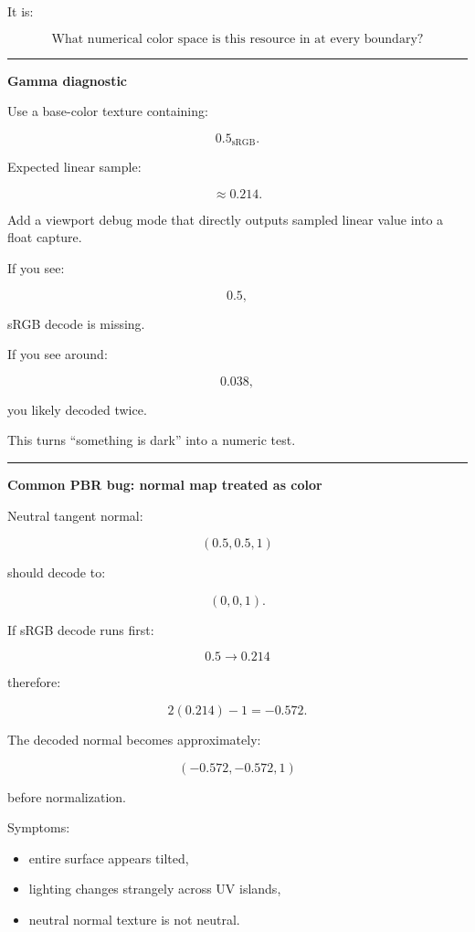 It is:

\[
\boxed{
\text{What numerical color space is this resource in at every boundary?}
}
\]

\begin{center}\rule{0.5\linewidth}{0.5pt}\end{center}

\textbf{Gamma diagnostic}

Use a base-color texture containing:

\[
0.5_{\text{sRGB}}.
\]

Expected linear sample:

\[
\approx0.214.
\]

Add a viewport debug mode that directly outputs sampled linear value into a float capture.

If you see:

\[
0.5,
\]

sRGB decode is missing.

If you see around:

\[
0.038,
\]

you likely decoded twice.

This turns ``something is dark'' into a numeric test.

\begin{center}\rule{0.5\linewidth}{0.5pt}\end{center}

\textbf{Common PBR bug: normal map treated as color}

Neutral tangent normal:

\[
(0.5,0.5,1)
\]

should decode to:

\[
(0,0,1).
\]

If sRGB decode runs first:

\[
0.5\rightarrow0.214
\]

therefore:

\[
2(0.214)-1=-0.572.
\]

The decoded normal becomes approximately:

\[
(-0.572,-0.572,1)
\]

before normalization.

Symptoms:

\begin{itemize}
\tightlist
\item
  entire surface appears tilted,
\item
  lighting changes strangely across UV islands,
\item
  neutral normal texture is not neutral.
\end{itemize}

